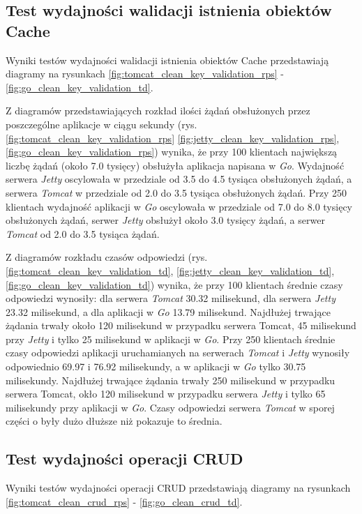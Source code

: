 
\clearpage

\subsection{Test wydajności walidacji istnienia obiektów Cache}
Wyniki testów wydajności walidacji istnienia obiektów Cache przedstawiają diagramy na rysunkach \ref{fig:tomcat_clean_key_validation_rps} - \ref{fig:go_clean_key_validation_td}.              

Z diagramów przedstawiających rozkład ilości żądań obsłużonych przez poszczególne aplikacje w ciągu sekundy  (rys. \ref{fig:tomcat_clean_key_validation_rps} \ref{fig:jetty_clean_key_validation_rps}, \ref{fig:go_clean_key_validation_rps}) wynika, że przy 100 klientach największą liczbę żądań (około 7.0 tysięcy) obsłużyła aplikacja napisana w \textsl{Go}. Wydajność serwera \textsl{Jetty} oscylowała w przedziale od 3.5 do 4.5 tysiąca obsłużonych żądań, a serwera \textsl{Tomcat} w przedziale od 2.0 do 3.5 tysiąca obsłużonych żądań. Przy 250 klientach wydajność aplikacji w \textsl{Go} oscylowała w przedziale od 7.0 do 8.0 tysięcy obsłużonych żądań, serwer \textsl{Jetty} obsłużył około 3.0 tysięcy żądań, a serwer \textsl{Tomcat} od 2.0 do 3.5 tysiąca żądań.

Z diagramów rozkładu czasów odpowiedzi (rys. \ref{fig:tomcat_clean_key_validation_td}, \ref{fig:jetty_clean_key_validation_td}, \ref{fig:go_clean_key_validation_td}) wynika, że przy 100 klientach średnie czasy odpowiedzi wynosiły: dla serwera \textsl{Tomcat} 30.32 milisekund, dla serwera \textsl{Jetty} 23.32 milisekund, a dla aplikacji w \textsl{Go} 13.79 milisekund. Najdłużej trwające żądania trwały około 120 milisekund w przypadku serwera Tomcat, 45 milisekund przy \textsl{Jetty} i tylko 25 milisekund w aplikacji w \textsl{Go}. Przy 250 klientach średnie czasy odpowiedzi aplikacji uruchamianych na serwerach \textsl{Tomcat} i \textsl{Jetty} wynosiły odpowiednio 69.97 i 76.92 milisekundy, a w aplikacji w \textsl{Go} tylko 30.75 milisekundy. Najdłużej trwające żądania trwały 250 milisekund w przypadku serwera Tomcat, okło 120 milisekund w przypadku serwera \textsl{Jetty} i tylko 65 milisekundy przy aplikacji w \textsl{Go}. Czasy odpowiedzi serwera \textsl{Tomcat} w sporej części o były dużo dłuższe niż pokazuje to średnia.


\clearpage

\subsection{Test wydajności operacji CRUD}
Wyniki testów wydajności operacji CRUD przedstawiają diagramy na rysunkach \ref{fig:tomcat_clean_crud_rps} - \ref{fig:go_clean_crud_td}.

